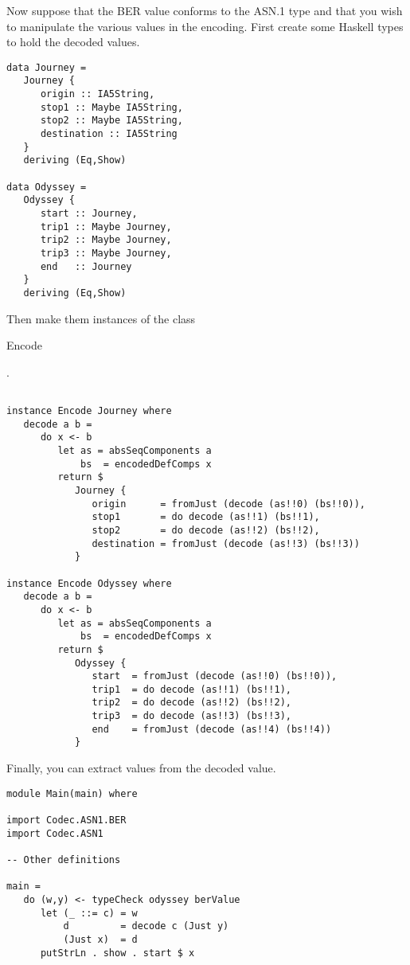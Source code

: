 \documentclass{article}
\begin{document}
Now suppose that the BER value conforms to the ASN.1 type and that
you wish to manipulate the various values in the encoding. First
create some Haskell types to hold the decoded values.

\begin{lstlisting}[frame=single]
data Journey =
   Journey {
      origin :: IA5String,
      stop1 :: Maybe IA5String,
      stop2 :: Maybe IA5String,
      destination :: IA5String
   }
   deriving (Eq,Show)

data Odyssey =
   Odyssey {
      start :: Journey,
      trip1 :: Maybe Journey,
      trip2 :: Maybe Journey,
      trip3 :: Maybe Journey,
      end   :: Journey
   }
   deriving (Eq,Show)
\end{lstlisting}

Then make them instances of the class {\begin{tt}Encode\end{tt}}.

\begin{lstlisting}[frame=single]

instance Encode Journey where
   decode a b =
      do x <- b
         let as = absSeqComponents a
             bs  = encodedDefComps x
         return $
            Journey {
               origin      = fromJust (decode (as!!0) (bs!!0)),
               stop1       = do decode (as!!1) (bs!!1),
               stop2       = do decode (as!!2) (bs!!2),
               destination = fromJust (decode (as!!3) (bs!!3))
            }

instance Encode Odyssey where
   decode a b =
      do x <- b
         let as = absSeqComponents a
             bs  = encodedDefComps x
         return $
            Odyssey {
               start  = fromJust (decode (as!!0) (bs!!0)),
               trip1  = do decode (as!!1) (bs!!1),
               trip2  = do decode (as!!2) (bs!!2),
               trip3  = do decode (as!!3) (bs!!3),
               end    = fromJust (decode (as!!4) (bs!!4))
            }

\end{lstlisting}

Finally, you can extract values from the decoded value.

\begin{lstlisting}[frame=single]
module Main(main) where

import Codec.ASN1.BER
import Codec.ASN1

-- Other definitions

main = 
   do (w,y) <- typeCheck odyssey berValue
      let (_ ::= c) = w
          d         = decode c (Just y)
          (Just x)  = d
      putStrLn . show . start $ x
\end{lstlisting}
\end{document}
